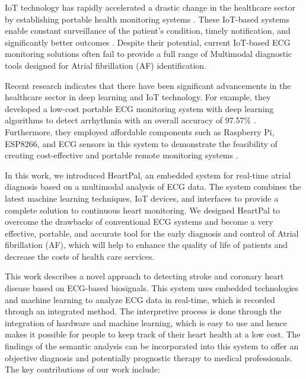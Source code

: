 \documentclass[conference]{IEEEtran}
\begin{document}
IoT technology has rapidly accelerated a drastic change in the healthcare sector by establishing portable health monitoring systems \cite{dalloul2023review}. These IoT-based systems enable constant surveillance of the patient's condition, timely notification, and significantly better outcomes \cite{boikanyo2023remote}. Despite their potential, current IoT-based ECG monitoring solutions often fail to provide a full range of Multimodal diagnostic tools designed for Atrial fibrillation (AF) identification. 

Recent research indicates that there have been significant advancements in the healthcare sector in deep learning and IoT technology. For example, they developed a low-cost portable ECG monitoring system with deep learning algorithms to detect arrhythmia with an overall accuracy of 97.57\% \cite{mehra2007global}. Furthermore, they employed affordable components such as Raspberry Pi, ESP8266, and ECG sensors in this system to demonstrate the feasibility of creating cost-effective and portable remote monitoring systems \cite{ahsanuzzaman2020low}.

In this work, we introduced HeartPal, an embedded system for real-time atrial diagnosis based on a multimodal analysis of ECG data. The system combines the latest machine learning techniques, IoT devices, and interfaces to provide a complete solution to continuous heart monitoring. We designed HeartPal to overcome the drawbacks of conventional ECG systems and become a very effective, portable, and accurate tool for the early diagnosis and control of Atrial fibrillation (AF), which will help to enhance the quality of life of patients and decrease the costs of health care services.

This work describes a novel approach to detecting stroke and coronary heart disease based on ECG-based biosignals. This system uses embedded technologies and machine learning to analyze ECG data in real-time, which is recorded through an integrated method. The interpretive process is done through the integration of hardware and machine learning, which is easy to use and hence makes it possible for people to keep track of their heart health at a low cost. The findings of the semantic analysis can be incorporated into this system to offer an objective diagnosis and potentially prognostic therapy to medical professionals. The key contributions of our work include:
\end{document}
